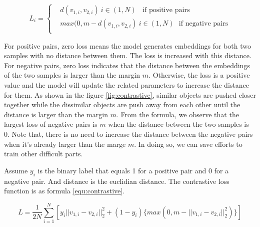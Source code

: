 \begin{equation}
L_i = \left\{
\begin{aligned}
 & d(v_{1,i}, v_{2,i}) \ i \in (1, N) \ \ \ \ \text{if positive pairs} \\
 & max(0, m - d(v_{1,i}, v_{2,i}) \   i \in (1, N) \ \  \  \text{if negative pairs} \\
\end{aligned}
\right.
\label{equ:loss}
\end{equation}

For positive pairs, zero loss means the model generates embeddings for both two samples with no distance between them. The loss is increased with this distance. For negative pairs, zero loss indicates that the distance between the embeddings of the two samples is larger than the margin $m$. Otherwise, the loss is a positive value and the model will update the related parameters to increase the distance for them. As shown in the figure \ref{fig:contrastive}, similar objects are pushed closer together while the dissimilar objects are push away from each other until the distance is larger than the margin $m$. From the formula, we observe that the largest loss of negative pairs is $m$ when the distance between the two samples is 0. Note that, there is no need to increase the distance between the negative pairs when it's already larger than the marge $m$. In doing so, we can save efforts to train other difficult parts. 

Assume $y_i$ is the binary label that equals 1 for a positive pair and 0 for a negative pair. And distance is the euclidian distance. The contrastive loss function is as formula \ref{equ:contrastive}.

\begin{equation}
L = \frac{1}{2N}\sum_{i=1}^{N}[y_i || v_{1,i} - v_{2,i} ||_2^2 +  (1 - y_i)\{ max(0, m - ||v_{1,i} - v_{2,i}||_2^2) \}]
\label{equ:contrastive}
\end{equation}

